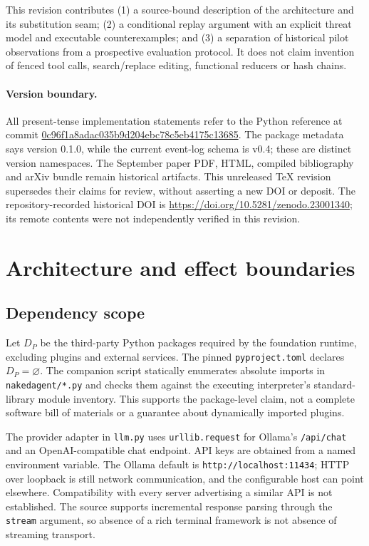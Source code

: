 \documentclass[10pt,twocolumn,letterpaper]{article}
\begin{document}
This revision contributes (1) a source-bound description of the architecture and its substitution seam; (2) a conditional replay argument with an explicit threat model and executable counterexamples; and (3) a separation of historical pilot observations from a prospective evaluation protocol. It does not claim invention of fenced tool calls, search/replace editing, functional reducers or hash chains.

\paragraph{Version boundary.}
All present-tense implementation statements refer to the Python reference at commit
\url{0c96f1a8adac035b9d204ebc78c5eb4175c13685}.
The package metadata says version 0.1.0, while the current event-log schema is v0.4; these are distinct version namespaces. The September paper PDF, HTML, compiled bibliography and arXiv bundle remain historical artifacts. This unreleased TeX revision supersedes their claims for review, without asserting a new DOI or deposit. The repository-recorded historical DOI is \url{https://doi.org/10.5281/zenodo.23001340}; its remote contents were not independently verified in this revision.

\section{Architecture and effect boundaries}
\subsection{Dependency scope}
Let $D_P$ be the third-party Python packages required by the foundation runtime, excluding plugins and external services. The pinned \texttt{pyproject.toml} declares $D_P=\varnothing$. The companion script statically enumerates absolute imports in \texttt{nakedagent/*.py} and checks them against the executing interpreter's standard-library module inventory. This supports the package-level claim, not a complete software bill of materials or a guarantee about dynamically imported plugins.

The provider adapter in \texttt{llm.py} uses \texttt{urllib.request} for Ollama's \texttt{/api/chat} and an OpenAI-compatible chat endpoint. API keys are obtained from a named environment variable. The Ollama default is \texttt{http://localhost:11434}; HTTP over loopback is still network communication, and the configurable host can point elsewhere. Compatibility with every server advertising a similar API is not established. The source supports incremental response parsing through the \texttt{stream} argument, so absence of a rich terminal framework is not absence of streaming transport.
\end{document}
